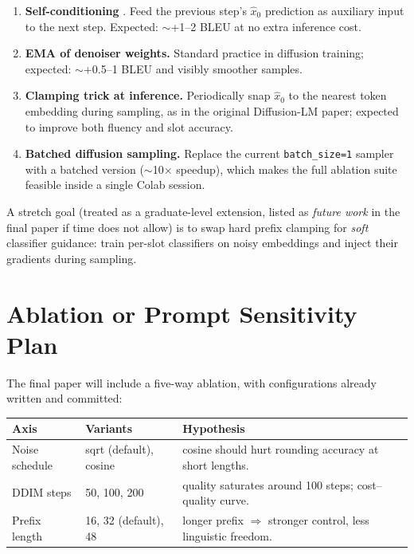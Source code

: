 \documentclass[11pt,a4paper]{article}
\begin{document}
\begin{enumerate}
  \item \textbf{Self-conditioning} \cite{chen2022analog}. Feed the previous
        step's $\hat x_0$ prediction as auxiliary input to the next step.
        Expected: $\sim$+1--2 BLEU at no extra inference cost.
  \item \textbf{EMA of denoiser weights.} Standard practice in diffusion
        training; expected: $\sim$+0.5--1 BLEU and visibly smoother samples.
  \item \textbf{Clamping trick at inference.} Periodically snap $\hat x_0$ to
        the nearest token embedding during sampling, as in the original
        Diffusion-LM paper; expected to improve both fluency and slot
        accuracy.
  \item \textbf{Batched diffusion sampling.} Replace the current
        \texttt{batch\_size=1} sampler with a batched version
        ($\sim$10$\times$ speedup), which makes the full ablation suite
        feasible inside a single Colab session.
\end{enumerate}

A stretch goal (treated as a graduate-level extension, listed as
\emph{future work} in the final paper if time does not allow) is to swap
hard prefix clamping for \emph{soft} classifier guidance: train per-slot
classifiers on noisy embeddings and inject their gradients during sampling.

\section{Ablation or Prompt Sensitivity Plan}

The final paper will include a five-way ablation, with configurations
already written and committed:

\begin{center}
\renewcommand{\arraystretch}{1.15}
\begin{tabular}{l l p{8.5cm}}
\toprule
\textbf{Axis} & \textbf{Variants} & \textbf{Hypothesis} \\
\midrule
Noise schedule  & sqrt (default), cosine               & cosine should hurt rounding accuracy at short lengths. \\
DDIM steps      & 50, 100, 200                         & quality saturates around 100 steps; cost--quality curve. \\
Prefix length   & 16, 32 (default), 48                 & longer prefix $\Rightarrow$ stronger control, less linguistic freedom. \\
\bottomrule
\end{tabular}
\end{center}
\end{document}

